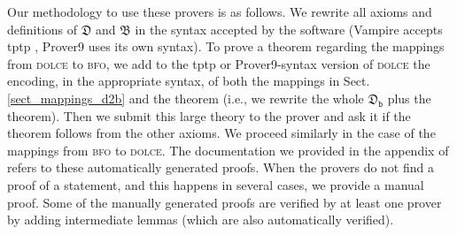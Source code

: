 \documentclass[ao]{iosart2x}
\newcommand{\nb}[1]{\textcolor{red}{$|$}\marginpar{\hspace*{-0cm}\parbox{20mm}{\scriptsize\raggedright\textcolor{red}{#1}}}}
\newcommand{\dolce}{{\textsc{dolce}}}
\newcommand{\bfo}{{\textsc{bfo}}}
\newcommand {\thdolce} {\ensuremath{\mathfrak{D}}}
\newcommand {\thbfo} {\ensuremath{\mathfrak{B}}}
\newcommand {\thdolcedbmap} {\ensuremath{\mathfrak{D}_\texttt{b}}}
\begin{document}

Our methodology to use these provers is as follows. We rewrite all axioms and definitions of {$\thdolce$} and $\thbfo$ in the syntax accepted by the software (Vampire accepts tptp \citep{Sut16}, Prover9 uses its own syntax).
To prove a theorem regarding the mappings from {\dolce} to {\bfo}, we add to the tptp or Prover9-syntax version of {\dolce} the encoding, in the appropriate syntax, of both the mappings in Sect.\ref{sect_mappings_d2b} and the theorem (i.e., we rewrite the whole $\thdolcedbmap$ plus the theorem). 
Then we submit this large theory to the prover and ask it if the theorem follows from the other axioms. 
We proceed similarly in the case of the mappings from {\bfo} to {\dolce}. The documentation we provided in the appendix of \cite{D24} %
refers to these automatically generated proofs.
When the provers do not find a proof of a statement, and this happens in several cases, we provide a manual proof. Some of the manually generated proofs are verified by at least one prover by adding intermediate lemmas (which are also automatically verified). %
\end{document}
